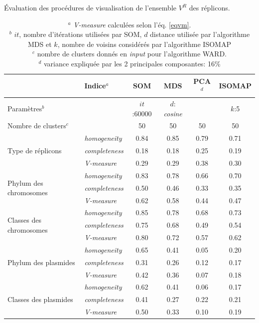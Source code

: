 \begin{table}[H]
     \caption[Évaluation des procédures de visualisation de l'ensemble des réplicons]{Évaluation des procédures de visualisation de l'ensemble $V^{R}$ des réplicons.}\label{tabscorevisu} 
      \begin{tabular}{@{\hspace{-1cm}\hspace{1cm}} p{}|l|c|c|c|c}
       & \textbf{Indice$^{a}$}  & \textbf{SOM}  & \textbf{MDS} &\textbf{PCA$^{d}$}  & \textbf{ISOMAP}\\
      \hline
      Paramètres$^{b}$ &  & $it$:60000 & $d$: \textit{cosine} &  & $k$:5 \\
      Nombre de clusters$^{c}$ & & 50 & 50 & 50 & 50 \\
      \hline
      \multirow{3}{*}{Type de réplicons} & \textit{homogeneity} & 0.84 & 0.85 & 0.79 & 0.71\\
      &\textit{completeness} & 0.18 & 0.18 & 0.25 & 0.19\\
      &\textit{V-measure} & 0.29 & 0.29 & 0.38 & 0.30\\
      \hline
      \multirow{3}{*}{Phylum des chromosomes} & \textit{homogeneity} & 0.83 & 0.78 & 0.66 & 0.70 \\
      &\textit{completeness} & 0.50 & 0.46 & 0.33 & 0.35\\
      &\textit{V-measure} & 0.62 & 0.58 & 0.44 & 0.47\\
      \hline
      \multirow{3}{*}{Classes des chromosomes} & \textit{homogeneity} & 0.85 & 0.78 & 0.68 & 0.73 \\
      &\textit{completeness} & 0.75 & 0.68 & 0.49 & 0.54\\
      &\textit{V-measure} & 0.80 & 0.72 & 0.57 & 0.62\\
      \hline
      \multirow{3}{*}{Phylum des plasmides} & \textit{homogeneity} & 0.65 & 0.41 & 0.05 & 0.20 \\
      &\textit{completeness} & 0.31 & 0.26 & 0.12 & 0.17\\
      &\textit{V-measure} & 0.42 & 0.36 & 0.07& 0.18\\
      \hline
      \multirow{3}{*}{Classes des plasmides} & \textit{homogeneity} & 0.62  & 0.41& 0.06 & 0.17\\
      &\textit{completeness} & 0.41 & 0.27 & 0.22 & 0.21\\
      &\textit{V-measure} & 0.50 & 0.33 & 0.10 & 0.19\\
      \hline
      \end{tabular}
      \vspace{0.5cm}
      \captionsetup{labelsep=space,justification=justified,singlelinecheck=off}
     \caption*{$^{a}$ \textit{V-measure} calculées selon l'éq. \ref{eqvm}. \\ $^{b}$ $it$, nombre d'itérations utilisées par SOM, $d$ distance utilisée par l'algorithme MDS et $k$, nombre de voisins considérés par l'algorithme ISOMAP \\ $^{c}$ nombre de clusters donnés en \textit{input} pour l'algorithme WARD. \\$^{d}$ variance expliquée par les 2 principales composantes: 16\% }
	\captionsetup{}	
	\end{table}
